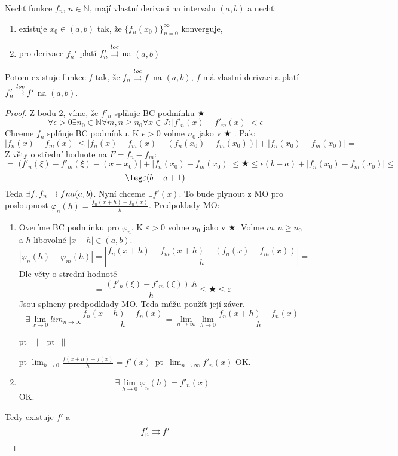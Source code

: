 \begin{vetat}
Nechť funkce $f_n$, $n \in \mathbb{N}$, mají vlastní derivaci na intervalu $(a,b)$ a nechť:
\begin{enumerate}
\item existuje $x_0 \in (a,b)$ tak, že $\{f_n(x_0)\}_{n=0}^{\infty}$ konverguje,
\item pro derivace $f_n'$ platí $f_n' \overset{loc}{\rightrightarrows}$ na $(a,b)$
\end{enumerate}
Potom existuje funkce $f$ tak, že $f_n \overset{loc}{\rightrightarrows} f$ na $(a,b)$, $f$ má vlastní derivaci a platí $f_n' \overset{loc}{\rightrightarrows} f'$ na $(a,b)$.
\end{vetat}
\begin{proof}
Z bodu 2, víme, že $f'_n$ splňuje BC podmínku $\bigstar$ 
$$\forall \epsilon > 0 \exists n_0 \in \mathbb{N} \forall m,n \geq n_0 \forall x \in J: |f'_n(x) - f'_m(x)| < \epsilon $$
Chceme $f_n$ splňuje BC podmínku. K $\epsilon > 0$ volme $n_0$ jako v $\bigstar$ . Pak:
$$|f_n(x) - f_m(x)| \leq |f_n(x) - f_m(x) - (f_n(x_0) - f_m(x_0))| + |f_n(x_0) - f_m(x_0)| =$$
Z věty o střední hodnote na $F = f_n - f_m$:
$$= |(f'_n(\xi) - f'_m(\xi) - (x-x_0)| + |f_n(x_0) - f_m(x_0)| \leq \bigstar \leq \epsilon (b-a) + |f_n(x_0) - f_m(x_0)|\leq $$
$$\leg \varepsilon (b-a+1)$$
Teda $\exists f, f_n \rightrightarrows f na (a,b)$. Nyní chceme $\exists f'(x)$. To bude plynout z MO pro posloupnost $\varphi _n (h) = \frac{f_n(x+h)-f_n(x)}{h}$.
Predpoklady MO:
\begin{enumerate}
\item Overíme BC podmínku pro $\varphi_n$. K $\varepsilon > 0$ volme $n_0$ jako v $\bigstar$. Volme $m,n \geq n_0 $ a $h$ libovolné $|x+h| \in (a,b)$.
$$|\varphi_n(h) - \varphi_m(h)| = |\frac{f_n(x+h) - f_m(x+h) - (f_n(x) - f_m(x))}{h}| = $$
Dle věty o strední hodnotě 
$$ = \frac{(f'_n(\xi) - f'_m(\xi)).h}{h}\leq \bigstar \leq \varepsilon $$
Jsou splneny predpodklady MO. Teda můžu použít její záver.
$$ \exists \lim_{x \to 0} lim_{n \to \infty} \frac{f_n(x+h) - f_n(x)}{h} = \lim_{n \to \infty} \lim_{h \to 0} \frac {f_n(x+h) - f_n(x)}{h}$$

 pt \hbox{ $\parallel$  pt  $\parallel$} \linebreak 

 pt 
\hbox {$ \lim_{h \to 0} \frac{f(x+h) - f(x)}{h} = f'(x)$
 pt 
$ \lim_{n \to \infty} f'_n(x) $} 
\linebreak
OK.
\item $$\exists \lim_{h \to 0} \varphi_n(h) = f'_n(x)$$ OK.
\end{enumerate}
\linebreak
Tedy existuje $f'$ a 
$$f'_n \rightrightarrows f' $$
\end{proof}
